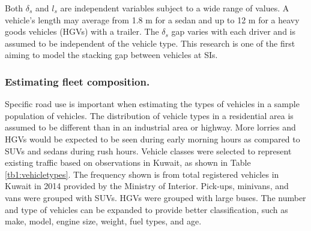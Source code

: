\documentclass[preprint,12pt,a4paper]{elsarticle}
\begin{document}
\begin{linenumbers}
Both $\delta_{s}$ and $l_{s}$ are independent variables subject to a wide range of values.  A vehicle's length may average from 1.8 m for a sedan and up to 12 m for a heavy goods vehicles (HGVs) with a trailer. The $\delta_{s}$ gap varies with each driver and is assumed to be independent of the vehicle type. This research is one of the first aiming to model the stacking gap between vehicles at SIs.

\subsubsection{Estimating fleet composition.}

Specific road use is important when estimating the types of vehicles in a sample population of vehicles.  The distribution of vehicle types in a residential area is assumed to be different than in an industrial area or highway. More lorries and HGVs would be expected to be seen during early morning hours as compared to SUVs and sedans during rush hours. Vehicle classes were selected to represent existing traffic based on observations in Kuwait, as shown in Table \ref{tb1:vehicletypes}. The frequency shown is from total registered vehicles in Kuwait in 2014 provided by the Ministry of Interior. Pick-ups, minivans, and vans were grouped with SUVs. HGVs were grouped with large buses. The number and type of vehicles can be expanded to provide better classification, such as make, model, engine size, weight, fuel types, and age.

\begin{table}[H]
\centering
\caption{Vehicle classes.}
\label{tb1:vehicletypes}
\end{table}


\end{linenumbers}
\end{document}
